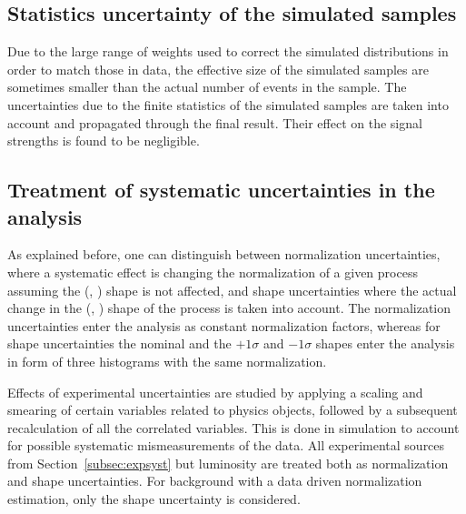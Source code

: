 \subsection{Statistics uncertainty of the simulated samples}

Due to the large range of weights used to correct the simulated distributions in order to
match those in data, the effective size of the simulated samples are sometimes smaller than
the actual number of events in the sample.
The uncertainties due to the finite statistics of the simulated samples are taken into account and propagated through the final result. Their effect on the signal strengths is found to be negligible.

\subsection{Treatment of systematic uncertainties in the analysis}\label{sec:syst_treatment}

As explained before, one can distinguish between normalization uncertainties, where a systematic effect is changing the normalization of a given process assuming the (\mll, \mt) shape is not affected, and shape uncertainties where the actual change in the (\mll, \mt) shape of the process is taken into account. The normalization uncertainties enter the analysis as constant normalization factors, whereas for shape uncertainties the nominal and the $+1\sigma$ and $-1\sigma$ shapes enter the analysis in form of three histograms with the same normalization. 

Effects of experimental uncertainties are studied by applying a scaling and smearing of certain variables related to physics objects, followed by a subsequent recalculation of all the correlated variables. This is done in simulation to account for possible systematic mismeasurements of the data. All experimental sources from Section~\ref{subsec:expsyst} but luminosity are treated both as normalization and shape uncertainties. For background with a data driven normalization estimation, only the shape uncertainty is considered.
